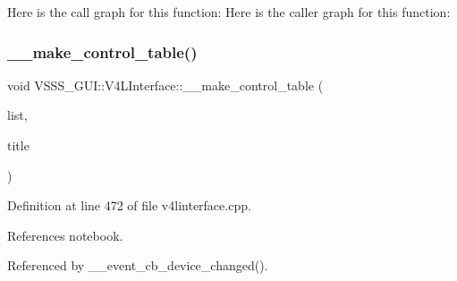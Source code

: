 Here is the call graph for this function\+:
Here is the caller graph for this function\+:
\mbox{\label{class_v_s_s_s___g_u_i_1_1_v4_l_interface_a4f70f4aaf3b7520d2f28ca06e3e94bd4}} 
\subsubsection{\texorpdfstring{\+\_\+\+\_\+make\+\_\+control\+\_\+table()}{\_\_make\_control\_table()}}
{\footnotesize\ttfamily void V\+S\+S\+S\+\_\+\+G\+U\+I\+::\+V4\+L\+Interface\+::\+\_\+\+\_\+make\+\_\+control\+\_\+table (\begin{DoxyParamCaption}\item[{std\+::list$<$ \hyperlink{namespace_v_s_s_s___g_u_i_a9eff2f5504f050458ee4bcf362482a8d}{Control\+Holder} $>$ \&}]{list,  }\item[{const char $\ast$}]{title }\end{DoxyParamCaption})\hspace{0.3cm}{\ttfamily [private]}}



Definition at line 472 of file v4linterface.\+cpp.



References notebook.



Referenced by \+\_\+\+\_\+event\+\_\+cb\+\_\+device\+\_\+changed().


